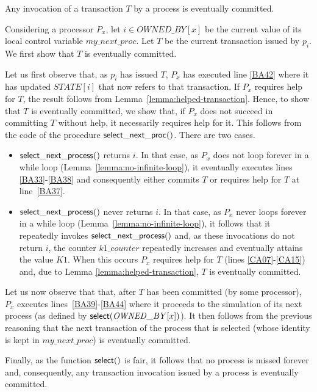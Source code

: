 \begin{lemma}
\label{lemma:transactions-are-committed}
Any invocation of a transaction $T$ by a process  is eventually committed.
\end{lemma}

\begin{proofL} 
Considering  a processor $P_x$,   let $i\in \mathit{OWNED\_BY}[x]$ be 
the current value of its local control variable $my\_next\_proc$.  
Let $T$ be the current transaction issued by $p_i$. 
We first show that $T$ is eventually committed.

Let us first observe that, as $p_i$ has issued $T$, $P_x$ has 
executed line \ref{BA42} 
where it has updated $\mathit{STATE}[i]$ that now refers to that transaction. 
If  $P_x$  requires help for $T$, the result  follows  from 
Lemma~\ref{lemma:helped-transaction}. 
 Hence,  to show that $T$ is eventually committed, we show that, if  $P_x$
does not  succeed in committing  $T$ without help, it necessarily  requires
help for it.  This  follows from the code of the procedure 
${\sf select\_next\_proc}()$. There are two cases. 
\begin{itemize}
\item
${\sf select\_next\_process}()$ returns $i$. 
In that  case, as $P_x$ does not loop forever in a while loop
(Lemma~\ref{lemma:no-infinite-loop}), it eventually executes lines 
\ref{BA33}-\ref{BA38} and consequently either commits $T$ or
 requires help for $T$ 
at line~\ref{BA37}. 
%
\item ${\sf select\_next\_process}()$ never returns $i$. 
In that case, as $P_x$ never loops forever in a  while loop 
(Lemma~\ref{lemma:no-infinite-loop}), it follows that 
it repeatedly invokes ${\sf select\_next\_process}()$ and, 
as these invocations do not return $i$, the counter $k1\_counter$ 
repeatedly increases and eventually attains the value $K1$. When 
this occurs $P_x$ requires help for $T$ (lines \ref{CA07}-\ref{CA15}) 
and, due to Lemma \ref{lemma:helped-transaction}, $T$ is eventually committed. 
\end{itemize}


Let  us  now  observe that  that, after  $T$  has been committed  (by  some
processor), $P_x$ executes lines~\ref{BA39}-\ref{BA44}  where  it
proceeds to the  simulation of its next process  (as defined by 
${\sf select}(\mathit{OWNED\_BY}[x])$).  It then  follows 
from the previous reasoning  that  the next transaction of the  process 
that is selected (whose identity is kept in $my\_next\_proc$) 
is eventually committed. 

Finally, as the function ${\sf select}()$ is  fair,  it follows that 
no  process  is  missed  forever and, consequently, any transaction 
invocation  issued by a process is eventually committed. 
\renewcommand{\toto}{lemma:transactions-are-committed}
\end{proofL}



